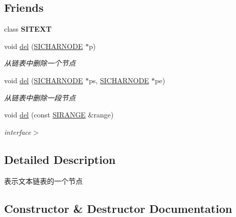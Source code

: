 \subsection*{Friends}
\begin{DoxyCompactItemize}
\item 
\mbox{\label{class_s_i_c_h_a_r_n_o_d_e_aed883eedffb01c3b6a299f070b3e1e55}} 
class {\bfseries S\+I\+T\+E\+XT}
\item 
void \hyperlink{class_s_i_c_h_a_r_n_o_d_e_a0a26b116c7c24705ce6e46295c9ff463}{del} (\hyperlink{class_s_i_c_h_a_r_n_o_d_e}{S\+I\+C\+H\+A\+R\+N\+O\+DE} $\ast$p)
\begin{DoxyCompactList}\small\item\em 从链表中删除一个节点~\newline
\end{DoxyCompactList}\item 
void \hyperlink{class_s_i_c_h_a_r_n_o_d_e_a2fc2b8710ced10535536295e09d52dca}{del} (\hyperlink{class_s_i_c_h_a_r_n_o_d_e}{S\+I\+C\+H\+A\+R\+N\+O\+DE} $\ast$ps, \hyperlink{class_s_i_c_h_a_r_n_o_d_e}{S\+I\+C\+H\+A\+R\+N\+O\+DE} $\ast$pe)
\begin{DoxyCompactList}\small\item\em 从链表中删除一段节点~\newline
\end{DoxyCompactList}\item 
void \hyperlink{class_s_i_c_h_a_r_n_o_d_e_ae8a96a04922f1d8b6da37c812048f6ad}{del} (const \hyperlink{struct_s_i_r_a_n_g_e}{S\+I\+R\+A\+N\+GE} \&range)
\begin{DoxyCompactList}\small\item\em interface$>$ \end{DoxyCompactList}\end{DoxyCompactItemize}


\subsection{Detailed Description}
表示文本链表的一个节点~\newline


\subsection{Constructor \& Destructor Documentation}
\mbox{\label{class_s_i_c_h_a_r_n_o_d_e_a69da1200fe43cf1aab75e44650cdd21b}} 
